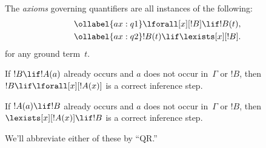 \documentclass[../../include/open-logic-section]{subfiles}
\begin{document}


\begin{defn}
The \emph{axioms} governing quantifiers are
all instances of the following:
\begin{align}
\ollabel{ax:q1} & \lforall[x][!B] \lif !B(t), \\
\ollabel{ax:q2} & !B(t) \lif \lexists[x][!B].
\end{align}
for any ground term~$t$.
\end{defn}

\begin{defn}
\item If $!B \lif !A(a)$ already occurs and $a$ does not occur in~$\Gamma$ or $!B$,
  then $!B \lif \lforall[x][!A(x)]$ is a correct inference step.
\item If $!A(a) \lif !B$ already occurs and $a$ does not occur in~$\Gamma$ or $!B$,
  then $\lexists[x][!A(x)] \lif !B$ is a correct inference step.
\end{defn}

We'll abbreviate either of these by ``QR.''
\end{document}
